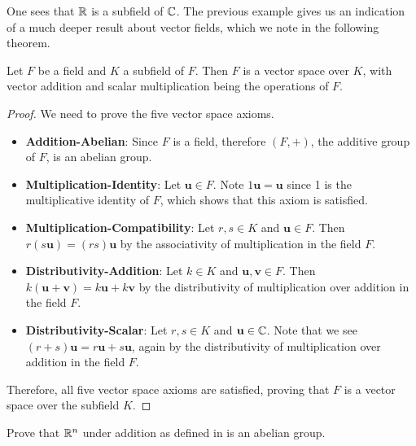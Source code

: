 One sees that $\mathbb{R}$ is a subfield of $\mathbb{C}$. The previous example gives us an indication of a much deeper result about vector fields, which we note in the following theorem.

\begin{theorem}\label{thrm-field-is-vector-space}
    Let $F$ be a field and $K$ a subfield of $F$. Then $F$ is a vector space over $K$, with vector addition and scalar multiplication being the operations of $F$.
\end{theorem}
\begin{proof}
    We need to prove the five vector space axioms.
    \begin{itemize}
        \item \textbf{Addition-Abelian}: Since $F$ is a field, therefore $(F, +)$, the additive group of $F$, is an abelian group.

        \item \textbf{Multiplication-Identity}: Let $\textbf{u} \in F$. Note $1\textbf{u} = \textbf{u}$ since 1 is the multiplicative identity of $F$, which shows that this axiom is satisfied.

        \item \textbf{Multiplication-Compatibility}: Let $r, s \in K$ and $\textbf{u} \in F$. Then $r(s\textbf{u}) = (rs)\textbf{u}$ by the associativity of multiplication in the field $F$.

        \item \textbf{Distributivity-Addition}: Let $k \in K$ and $\textbf{u}, \textbf{v} \in F$. Then $k(\textbf{u} + \textbf{v}) = k\textbf{u} + k\textbf{v}$ by the distributivity of multiplication over addition in the field $F$.

        \item \textbf{Distributivity-Scalar}: Let $r, s \in K$ and $\textbf{u} \in \mathbb{C}$. Note that we see $(r+s)\textbf{u} = r\textbf{u} + s\textbf{u}$, again by the distributivity of multiplication over addition in the field $F$.
    \end{itemize}

    Therefore, all five vector space axioms are satisfied, proving that $F$ is a vector space over the subfield $K$.
\end{proof}

\begin{exercise}\label{exercise-R^n-is-abelian-group}
    Prove that $\mathbb{R}^n$ under addition as defined in  is an abelian group.
\end{exercise}

